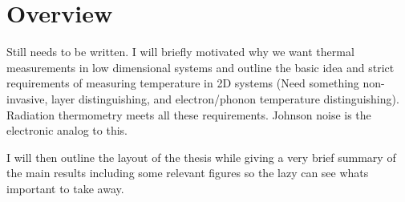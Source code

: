 \chapter{Overview}
\label{ch:overview}

Still needs to be written. I will briefly motivated why we want thermal measurements in low dimensional systems and outline the basic idea and strict requirements of measuring temperature in 2D systems (Need something non-invasive, layer distinguishing, and electron/phonon temperature distinguishing). Radiation thermometry meets all these requirements. Johnson noise is the electronic analog to this.

I will then outline the layout of the thesis while giving a very brief summary of the main results including some relevant figures so the lazy can see whats important to take away.